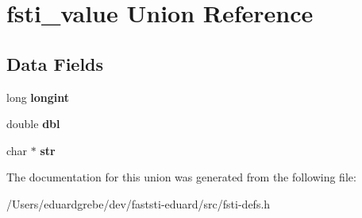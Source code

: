 \hypertarget{unionfsti__value}{}\section{fsti\+\_\+value Union Reference}
\label{unionfsti__value}
\subsection*{Data Fields}
\begin{DoxyCompactItemize}
\item 
\mbox{\label{unionfsti__value_a447fe3b0025c905b135bd83644de1835}} 
long {\bfseries longint}
\item 
\mbox{\label{unionfsti__value_abc19a0fa0d2b51651557de2996a20ae7}} 
double {\bfseries dbl}
\item 
\mbox{\label{unionfsti__value_a516816f638918a4896c2405c707d37c9}} 
char $\ast$ {\bfseries str}
\end{DoxyCompactItemize}


The documentation for this union was generated from the following file\+:\begin{DoxyCompactItemize}
\item 
/\+Users/eduardgrebe/dev/faststi-\/eduard/src/fsti-\/defs.\+h\end{DoxyCompactItemize}
